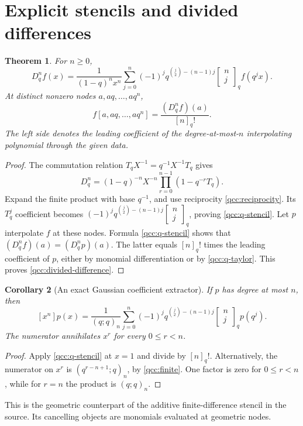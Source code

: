 \documentclass[11pt,a4paper,oneside,openany]{book}
\newtheorem{theorem}{Theorem}[chapter]
\newtheorem{corollary}[theorem]{Corollary}
\theoremstyle{definition}
\theoremstyle{remark}
\newcommand{\GB}[3][q]{\begin{bmatrix}#2\\#3\end{bmatrix}_{#1}}
\newcommand{\qf}[2][q]{[#2]_{#1}!}
\begin{document}
\section{Explicit stencils and divided differences}
\begin{theorem}\label{qcc:stencil}
For \(n\ge0\),
\begin{equation}\label{qcc:q-stencil}
 D_q^nf(x)=\frac1{(1-q)^nx^n}
 \sum_{j=0}^n(-1)^j q^{\binom j2-(n-1)j}\GB nj f(q^jx).
\end{equation}
At distinct nonzero nodes \(a,aq,\ldots,aq^n\),
\begin{equation}\label{qcc:divided-difference}
 f[a,aq,\ldots,aq^n]=\frac{(D_q^nf)(a)}{\qf n}.
\end{equation}
The left side denotes the leading coefficient of the degree-at-most-\(n\)
interpolating polynomial through the given data.
\end{theorem}
\begin{proof}
The commutation relation \(T_qX^{-1}=q^{-1}X^{-1}T_q\) gives
\[
 D_q^n=(1-q)^{-n}X^{-n}\prod_{r=0}^{n-1}(1-q^{-r}T_q).
\]
Expand the finite product with base \(q^{-1}\), and use reciprocity
\eqref{qcc:reciprocity}. Its \(T_q^j\) coefficient becomes
\((-1)^jq^{\binom j2-(n-1)j}\GB nj\), proving
\eqref{qcc:q-stencil}.
Let \(p\) interpolate \(f\) at these nodes. Formula \eqref{qcc:q-stencil}
shows that \((D_q^nf)(a)=(D_q^np)(a)\). The latter equals \([n]_q!\) times
the leading coefficient of \(p\), either by monomial differentiation or by
\cref{qcc:q-taylor}. This proves \eqref{qcc:divided-difference}.
\end{proof}

\begin{corollary}[An exact Gaussian coefficient extractor]\label{qcc:extractor}
If \(p\) has degree at most \(n\), then
\begin{equation}\label{qcc:extractor-formula}
 [x^n]p(x)=\frac1{(q;q)_n}
 \sum_{j=0}^n(-1)^j q^{\binom j2-(n-1)j}\GB nj p(q^j).
\end{equation}
The numerator annihilates \(x^r\) for every \(0\le r<n\).
\end{corollary}
\begin{proof}
Apply \eqref{qcc:q-stencil} at \(x=1\) and divide by \([n]_q!\).
Alternatively, the numerator on \(x^r\) is
\((q^{r-n+1};q)_n\), by \eqref{qcc:finite}. One factor is zero for
\(0\le r<n\), while for \(r=n\) the product is \((q;q)_n\).
\end{proof}
This is the geometric counterpart of the additive finite-difference stencil in
the source. Its cancelling objects are monomials evaluated at geometric nodes.
\end{document}
